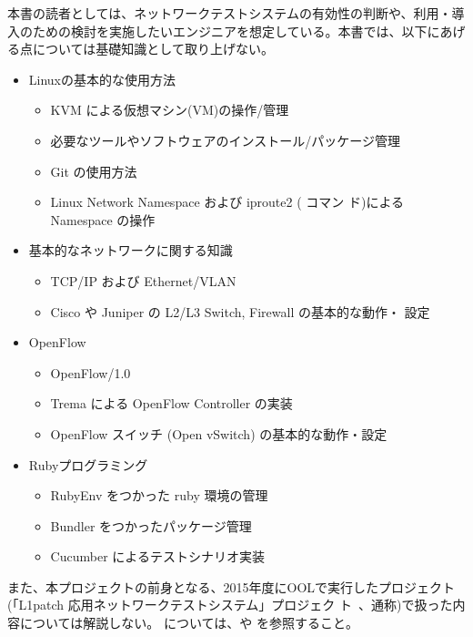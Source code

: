本書の読者としては、ネットワークテストシステムの有効性の判断や、利用・導
入のための検討を実施したいエンジニアを想定している。本書では、以下にあげ
る点については基礎知識として取り上げない。

\begin{itemize}
 \item Linuxの基本的な使用方法
       \begin{itemize}
        \item KVM による仮想マシン(VM)の操作/管理
        \item 必要なツールやソフトウェアのインストール/パッケージ管理
        \item Git の使用方法
        \item Linux Network Namespace および iproute2 (  コマン
              ド)によるNamespace の操作
       \end{itemize}
 \item 基本的なネットワークに関する知識
       \begin{itemize}
        \item TCP/IP および Ethernet/VLAN
        \item Cisco や Juniper の L2/L3 Switch, Firewall の基本的な動作・
              設定
       \end{itemize}
 \item OpenFlow
       \begin{itemize}
        \item OpenFlow/1.0
        \item Trema による OpenFlow Controller の実装
        \item OpenFlow スイッチ (Open vSwitch) の基本的な動作・設定
       \end{itemize}
 \item Rubyプログラミング
       \begin{itemize}
        \item RubyEnv をつかった ruby 環境の管理
        \item Bundler をつかったパッケージ管理
        \item Cucumber によるテストシナリオ実装
       \end{itemize}
\end{itemize}

また、本プロジェクトの前身となる、2015年度にOOLで実行したプロジェクト
(「L1patch 応用ネットワークテストシステム」プロジェク
ト~\cite{ool-l1pj-web}、通称\lopj)で扱った内容については解説しない。
\lopj については、\lopjpoc や \lopjtech を参照すること。

